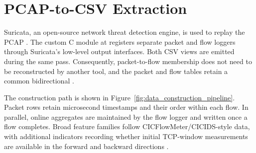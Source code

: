 \documentclass[11pt,fleqn]{report}
\begin{document}
\section{PCAP-to-CSV Extraction}
\label{subsec:pcap_extraction}

Suricata, an open-source network threat detection engine, is used to replay the PCAP \cite{Roesch1999,SuricataGuide2026}. The custom C module at  registers separate packet and flow loggers through Suricata's low-level output interfaces. Both CSV views are emitted during the same pass. Consequently, packet-to-flow membership does not need to be reconstructed by another tool, and the packet and flow tables retain a common bidirectional .

The construction path is shown in Figure~\ref{fig:data_construction_pipeline}. Packet rows retain microsecond timestamps and their order within each flow. In parallel, online aggregates are maintained by the flow logger and written once a flow completes. Broad feature families follow CICFlowMeter/CICIDS-style data, with additional indicators recording whether initial TCP-window measurements are available in the forward and backward directions
\cite{Sharafaldin2018CICIDS}.
\end{document}
